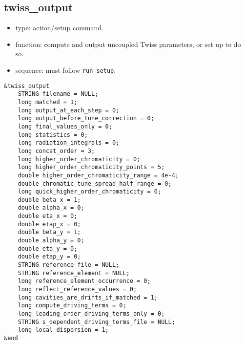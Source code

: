 \documentclass[11pt]{article}
\begin{document}
\subsection{twiss\_output \label{subsec:twissoutput}}

\begin{itemize}
\item type: action/setup command.
\item function: compute and output uncoupled Twiss parameters, or set up to do so.
\item sequence: must follow \verb|run_setup|.
\end{itemize}

\begin{verbatim}
&twiss_output
    STRING filename = NULL;
    long matched = 1;
    long output_at_each_step = 0;
    long output_before_tune_correction = 0;
    long final_values_only = 0;
    long statistics = 0;
    long radiation_integrals = 0;
    long concat_order = 3;
    long higher_order_chromaticity = 0;
    long higher_order_chromaticity_points = 5;
    double higher_order_chromaticity_range = 4e-4;
    double chromatic_tune_spread_half_range = 0;
    long quick_higher_order_chromaticity = 0;
    double beta_x = 1;
    double alpha_x = 0;
    double eta_x = 0;
    double etap_x = 0;
    double beta_y = 1;
    double alpha_y = 0;
    double eta_y = 0;
    double etap_y = 0;
    STRING reference_file = NULL;
    STRING reference_element = NULL;
    long reference_element_occurrence = 0;
    long reflect_reference_values = 0;
    long cavities_are_drifts_if_matched = 1;
    long compute_driving_terms = 0;
    long leading_order_driving_terms_only = 0;
    STRING s_dependent_driving_terms_file = NULL;
    long local_dispersion = 1;
&end
\end{verbatim}
\end{document}
